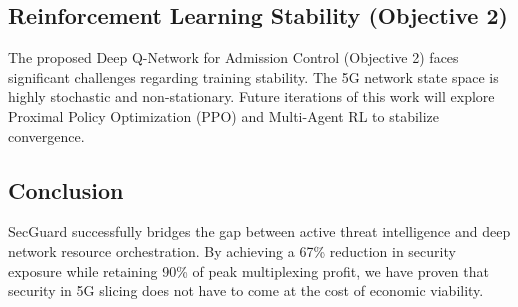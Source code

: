 \documentclass[12pt]{article}
\newcommand{\setchapterheader}[1]{%
  \fancyhead[L]{\textit{#1}}%
}
\begin{document}
\subsection{Reinforcement Learning Stability (Objective 2)}
The proposed Deep Q-Network for Admission Control (Objective 2) faces significant challenges regarding training stability. The 5G network state space is highly stochastic and non-stationary. Future iterations of this work will explore Proximal Policy Optimization (PPO) and Multi-Agent RL to stabilize convergence.

\subsection{Conclusion}
SecGuard successfully bridges the gap between active threat intelligence and deep network resource orchestration. By achieving a 67\% reduction in security exposure while retaining 90\% of peak multiplexing profit, we have proven that security in 5G slicing does not have to come at the cost of economic viability.
\clearpage
\setchapterheader{References}
\end{document}

